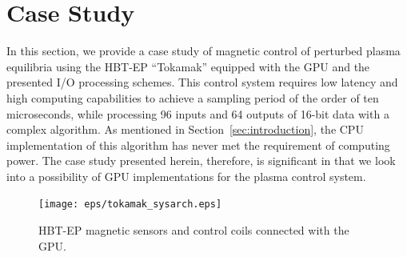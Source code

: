 \section{Case Study}
\label{sec:case_study}

In this section, we provide a case study of magnetic control of
perturbed plasma equilibria using the HBT-EP ``Tokamak'' equipped with
the GPU and the presented I/O processing schemes.
This control system requires low latency and high computing capabilities
to achieve a sampling period of the order of ten microseconds, while
processing 96 inputs and 64 outputs of 16-bit data with a complex
algorithm.
As mentioned in Section~\ref{sec:introduction}, the CPU implementation
of this algorithm has never met the requirement of computing power.
The case study presented herein, therefore, is significant in that we look
into a possibility of GPU implementations for the plasma control system.

\begin{figure}[t]
 \centering
 \texttt{[image: eps/tokamak\_sysarch.eps]}
 \caption{HBT-EP magnetic sensors and control coils connected with the
 GPU.}
 \label{fig:tokamak_sysarch}
\end{figure}

